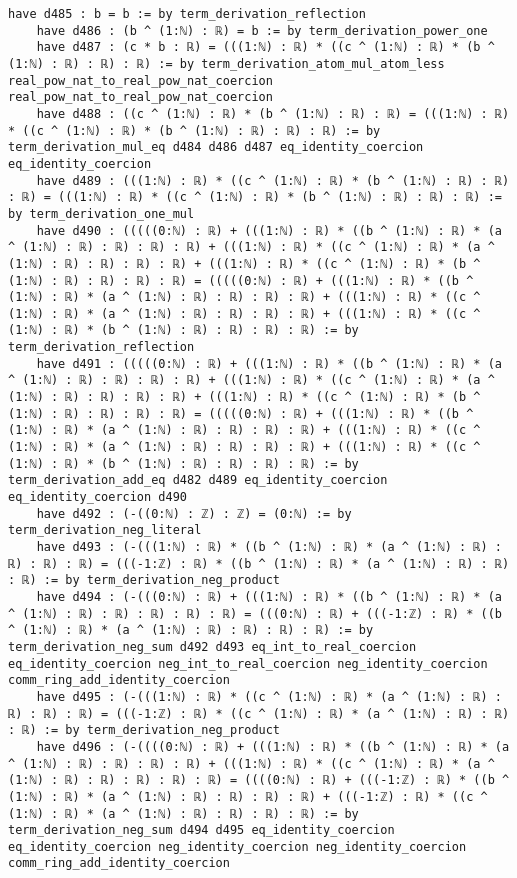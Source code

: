 \documentclass{article}
\begin{document}
\begin{tcolorbox}[colback=white!10, width=\linewidth]
\begin{lstlisting}[language=Lean4]
    have d485 : b = b := by term_derivation_reflection
    have d486 : (b ^ (1:ℕ) : ℝ) = b := by term_derivation_power_one
    have d487 : (c * b : ℝ) = (((1:ℕ) : ℝ) * ((c ^ (1:ℕ) : ℝ) * (b ^ (1:ℕ) : ℝ) : ℝ) : ℝ) := by term_derivation_atom_mul_atom_less real_pow_nat_to_real_pow_nat_coercion real_pow_nat_to_real_pow_nat_coercion
    have d488 : ((c ^ (1:ℕ) : ℝ) * (b ^ (1:ℕ) : ℝ) : ℝ) = (((1:ℕ) : ℝ) * ((c ^ (1:ℕ) : ℝ) * (b ^ (1:ℕ) : ℝ) : ℝ) : ℝ) := by term_derivation_mul_eq d484 d486 d487 eq_identity_coercion eq_identity_coercion
    have d489 : (((1:ℕ) : ℝ) * ((c ^ (1:ℕ) : ℝ) * (b ^ (1:ℕ) : ℝ) : ℝ) : ℝ) = (((1:ℕ) : ℝ) * ((c ^ (1:ℕ) : ℝ) * (b ^ (1:ℕ) : ℝ) : ℝ) : ℝ) := by term_derivation_one_mul
    have d490 : (((((0:ℕ) : ℝ) + (((1:ℕ) : ℝ) * ((b ^ (1:ℕ) : ℝ) * (a ^ (1:ℕ) : ℝ) : ℝ) : ℝ) : ℝ) + (((1:ℕ) : ℝ) * ((c ^ (1:ℕ) : ℝ) * (a ^ (1:ℕ) : ℝ) : ℝ) : ℝ) : ℝ) + (((1:ℕ) : ℝ) * ((c ^ (1:ℕ) : ℝ) * (b ^ (1:ℕ) : ℝ) : ℝ) : ℝ) : ℝ) = (((((0:ℕ) : ℝ) + (((1:ℕ) : ℝ) * ((b ^ (1:ℕ) : ℝ) * (a ^ (1:ℕ) : ℝ) : ℝ) : ℝ) : ℝ) + (((1:ℕ) : ℝ) * ((c ^ (1:ℕ) : ℝ) * (a ^ (1:ℕ) : ℝ) : ℝ) : ℝ) : ℝ) + (((1:ℕ) : ℝ) * ((c ^ (1:ℕ) : ℝ) * (b ^ (1:ℕ) : ℝ) : ℝ) : ℝ) : ℝ) := by term_derivation_reflection
    have d491 : (((((0:ℕ) : ℝ) + (((1:ℕ) : ℝ) * ((b ^ (1:ℕ) : ℝ) * (a ^ (1:ℕ) : ℝ) : ℝ) : ℝ) : ℝ) + (((1:ℕ) : ℝ) * ((c ^ (1:ℕ) : ℝ) * (a ^ (1:ℕ) : ℝ) : ℝ) : ℝ) : ℝ) + (((1:ℕ) : ℝ) * ((c ^ (1:ℕ) : ℝ) * (b ^ (1:ℕ) : ℝ) : ℝ) : ℝ) : ℝ) = (((((0:ℕ) : ℝ) + (((1:ℕ) : ℝ) * ((b ^ (1:ℕ) : ℝ) * (a ^ (1:ℕ) : ℝ) : ℝ) : ℝ) : ℝ) + (((1:ℕ) : ℝ) * ((c ^ (1:ℕ) : ℝ) * (a ^ (1:ℕ) : ℝ) : ℝ) : ℝ) : ℝ) + (((1:ℕ) : ℝ) * ((c ^ (1:ℕ) : ℝ) * (b ^ (1:ℕ) : ℝ) : ℝ) : ℝ) : ℝ) := by term_derivation_add_eq d482 d489 eq_identity_coercion eq_identity_coercion d490
    have d492 : (-((0:ℕ) : ℤ) : ℤ) = (0:ℕ) := by term_derivation_neg_literal
    have d493 : (-(((1:ℕ) : ℝ) * ((b ^ (1:ℕ) : ℝ) * (a ^ (1:ℕ) : ℝ) : ℝ) : ℝ) : ℝ) = (((-1:ℤ) : ℝ) * ((b ^ (1:ℕ) : ℝ) * (a ^ (1:ℕ) : ℝ) : ℝ) : ℝ) := by term_derivation_neg_product
    have d494 : (-(((0:ℕ) : ℝ) + (((1:ℕ) : ℝ) * ((b ^ (1:ℕ) : ℝ) * (a ^ (1:ℕ) : ℝ) : ℝ) : ℝ) : ℝ) : ℝ) = (((0:ℕ) : ℝ) + (((-1:ℤ) : ℝ) * ((b ^ (1:ℕ) : ℝ) * (a ^ (1:ℕ) : ℝ) : ℝ) : ℝ) : ℝ) := by term_derivation_neg_sum d492 d493 eq_int_to_real_coercion eq_identity_coercion neg_int_to_real_coercion neg_identity_coercion comm_ring_add_identity_coercion
    have d495 : (-(((1:ℕ) : ℝ) * ((c ^ (1:ℕ) : ℝ) * (a ^ (1:ℕ) : ℝ) : ℝ) : ℝ) : ℝ) = (((-1:ℤ) : ℝ) * ((c ^ (1:ℕ) : ℝ) * (a ^ (1:ℕ) : ℝ) : ℝ) : ℝ) := by term_derivation_neg_product
    have d496 : (-((((0:ℕ) : ℝ) + (((1:ℕ) : ℝ) * ((b ^ (1:ℕ) : ℝ) * (a ^ (1:ℕ) : ℝ) : ℝ) : ℝ) : ℝ) + (((1:ℕ) : ℝ) * ((c ^ (1:ℕ) : ℝ) * (a ^ (1:ℕ) : ℝ) : ℝ) : ℝ) : ℝ) : ℝ) = ((((0:ℕ) : ℝ) + (((-1:ℤ) : ℝ) * ((b ^ (1:ℕ) : ℝ) * (a ^ (1:ℕ) : ℝ) : ℝ) : ℝ) : ℝ) + (((-1:ℤ) : ℝ) * ((c ^ (1:ℕ) : ℝ) * (a ^ (1:ℕ) : ℝ) : ℝ) : ℝ) : ℝ) := by term_derivation_neg_sum d494 d495 eq_identity_coercion eq_identity_coercion neg_identity_coercion neg_identity_coercion comm_ring_add_identity_coercion

\end{lstlisting}
\end{tcolorbox}
\end{document}

